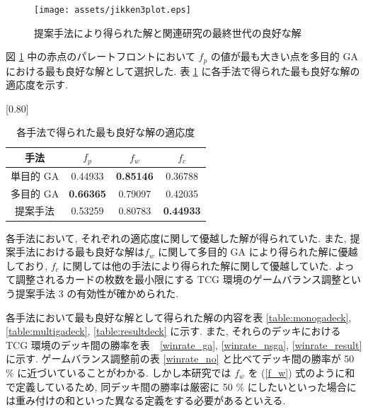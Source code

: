 \documentclass[12pt]{jarticle}
\begin{document}
\begin{figure}[t]
  \centering
  \texttt{[image: assets/jikken3plot.eps]}
  \vspace{-0.3cm}
  \caption{提案手法により得られた解と関連研究の最終世代の良好な解}
  \label{fig:jikken3plot}
\end{figure}
図 \ref{fig:jikken3plot} 中の赤点のパレートフロントにおいて $f_p$ の値が最も大きい点を多目的 GA における最も良好な解として選択した.
表 \ref{res_3} に各手法で得られた最も良好な解の適応度を示す.
\begin{table}[t]
  \centering
  \caption{各手法で得られた最も良好な解の適応度}
  \label{res_3}
  \vspace{-0.3cm}
  
  \scalebox{0.80}[0.80]{
    \begin{tabular}{|c|c|c|c|}
      \hline
      手法        & $f_p$ & $f_w$ & $f_c$ \\ \hline \hline
      単目的 GA      & 0.44933         & \textbf{0.85146}   & 0.36788          \\ \hline
      多目的 GA  & \textbf{0.66365}         & 0.79097   & 0.42035          \\ \hline
      提案手法   & 0.53259              &  0.80783     & \textbf{0.44933}  \\ \hline
      \end{tabular}
  }
  \vspace{-0.3cm}
  \end{table}
\par
各手法において, それぞれの適応度に関して優越した解が得られていた. また, 提案手法における最も良好な解は$f_w$ に関して多目的 GA により得られた解に優越しており, $f_c$ に関しては他の手法により得られた解に関して優越していた. よって調整されるカードの枚数を最小限にする TCG 環境のゲームバランス調整という提案手法 3 の有効性が確かめられた.
\par
各手法において最も良好な解として得られた解の内容を表 \ref{table:monogadeck}, \ref{table:multigadeck}, \ref{table:resultdeck} に示す.
 また, それらのデッキにおける TCG 環境のデッキ間の勝率を表　\ref{winrate_ga}, \ref{winrate_nsga}, \ref{winrate_result} に示す. ゲームバランス調整前の表 \ref{winrate_no} と比べてデッキ間の勝率が 50 \% に近づいていることがわかる. しかし本研究では $f_w$ を (\ref{f_w}) 式のように和で定義しているため, 同デッキ間の勝率は厳密に 50 \% にしたいといった場合には重み付けの和といった異なる定義をする必要があるといえる.
\end{document}
